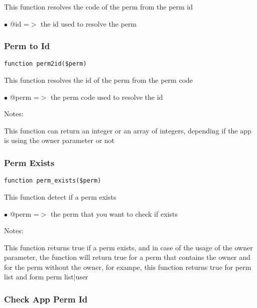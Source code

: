 \documentclass[a4paper]{article}
\begin{document}
This function resolves the code of the perm from the perm id

\begin{compactitem}
\item[\color{myblue}$\bullet$] @id =$>$ the id used to resolve the perm
\end{compactitem}

\hypertarget{toc195}{}
\subsubsection{Perm to Id}

\begin{lstlisting}
function perm2id($perm)
\end{lstlisting}

This function resolves the id of the perm from the perm code

\begin{compactitem}
\item[\color{myblue}$\bullet$] @perm =$>$ the perm code used to resolve the id
\end{compactitem}

Notes:

This function can return an integer or an array of integers, depending
if the app is using the owner parameter or not

\hypertarget{toc196}{}
\subsubsection{Perm Exists}

\begin{lstlisting}
function perm_exists($perm)
\end{lstlisting}

This function detect if a perm exists

\begin{compactitem}
\item[\color{myblue}$\bullet$] @perm =$>$ the perm that you want to check if exists
\end{compactitem}

Notes:

This function returns true if a perm exists, and in case of the usage
of the owner parameter, the function will return true for a perm that
contains the owner and for the perm without the owner, for exampe, this
function returns true for perm list and form perm list$|$user

\hypertarget{toc197}{}
\subsubsection{Check App Perm Id}
\end{document}
